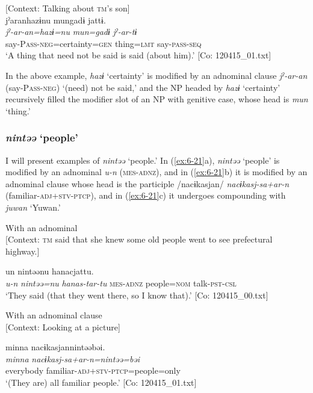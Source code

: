 \ea\label{ex:6-20}
 [Context: Talking about \textsc{tm}’s son]\\

{\TM}
\glll jˀaranhazɨnu  mungadɨ  jattɨ.\\
\textit{jˀ-ar-an=hazɨ=nu}  \textit{mun=gadɨ}  \textit{jˀ-ar-tɨ}\\
    say-P\textsc{ass}-\textsc{neg}=certainty=\textsc{gen}  thing=\textsc{lmt}  say-\textsc{pass}-\textsc{seq}\\
\glt    ‘A thing that need not be said is said (about him).’ [Co: 120415\_01.txt]
\z

In the above example, \textit{hazɨ} ‘certainty’ is modified by an adnominal clause \textit{jˀ-ar-an} (say-P\textsc{ass}-\textsc{neg}) ‘(need) not be said,’ and the NP headed by \textit{hazɨ} ‘certainty’ recursively filled the modifier slot of an NP with genitive case, whose head is \textit{mun} ‘thing.’

\subsubsection{\textit{nintəə} ‘people’}

I will present examples of \textit{nintəə} ‘people.’ In (\ref{ex:6-21}a), \textit{nintəə} ‘people’ is modified by an adnominal \textit{u-n} (\textsc{mes}-\textsc{adnz}), and in (\ref{ex:6-21}b) it is modified by an adnominal clause whose head is the participle /nacɨkasjan/ \textit{nacɨkasj-sa+ar-n} (familiar-\textsc{adj}+\textsc{stv}-\textsc{ptcp}), and in (\ref{ex:6-21}c) it undergoes compounding with \textit{juwan} ‘Yuwan.’

\ea\label{ex:6-21}
\ea With an adnominal\\{}
[Context: \textsc{tm} said that she knew some old people went to see prefectural highway.]

{\TM}
\glll un  nintəənu  hanacjattu.\\
      \textit{u-n}  \textit{nintəə=nu}  \textit{hanas-tar-tu}
      \textsc{mes}-\textsc{adnz}  people=\textsc{nom}  talk-\textsc{pst}-\textsc{csl}\\
\glt ‘They said (that they went there, so I know that).’ [Co: 120415\_00.txt]
\z

\ex With an adnominal clause\\{}
[Context: Looking at a picture]

{\TM}
\glll minna  nacɨkasjannintəəbəi.\\
      \textit{minna}  \textit{nacɨkasj-sa+ar-n=nintəə=bəi}\\
      everybody  familiar-\textsc{adj}+\textsc{stv}-\textsc{ptcp}=people=only\\
\glt ‘(They are) all familiar people.’ [Co: 120415\_01.txt]
\z

